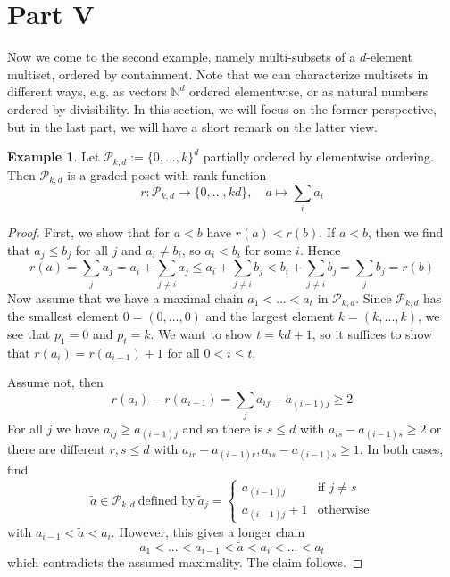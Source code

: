 \documentclass{scrartcl}
\newcommand{\N}{\mathbb{N}}
\theoremstyle{definition}
\newtheorem{example}[definition]{Example}
\begin{document}
\section{Part V}
Now we come to the second example, namely multi-subsets of a $d$-element multiset, ordered by containment.
Note that we can characterize multisets in different ways, e.g. as vectors $\N^d$ ordered elementwise, or as natural numbers ordered by divisibility.
In this section, we will focus on the former perspective, but in the last part, we will have a short remark on the latter view.
\begin{example}
    Let $\mathcal{P}_{k, d} := \{ 0, ..., k \}^d$ partially ordered by elementwise ordering.
    Then $\mathcal{P}_{k, d}$ is a graded poset with rank function
    \begin{equation*}
        r: \mathcal{P}_{k, d} \to \{ 0, ..., kd \}, \quad a \mapsto \sum_i a_i
    \end{equation*}
\end{example}
\begin{proof}
    First, we show that for $a < b$ have $r(a) < r(b)$.
    If $a < b$, then we find that $a_j \leq b_j$ for all $j$ and $a_i \neq b_i$, so $a_i < b_i$ for some $i$.
    Hence
    \begin{equation*}
        r(a) = \sum_j a_j = a_i + \sum_{j \neq i} a_j \leq a_i + \sum_{j \neq i} b_j < b_i + \sum_{j \neq i} b_j = \sum_j b_j = r(b)
    \end{equation*}
    Now assume that we have a maximal chain $a_1 < ... < a_t$ in $\mathcal{P}_{k, d}$.
    Since $\mathcal{P}_{k, d}$ has the smallest element $0 = (0, ..., 0)$ and the largest element $k = (k, ..., k)$, we see that $p_1 = 0$ and $p_t = k$.
    We want to show $t = kd + 1$, so it suffices to show that $r(a_i) = r(a_{i - 1}) + 1$ for all $0 < i \leq t$.

    Assume not, then 
    \begin{equation*}
        r(a_i) - r(a_{i - 1}) = \sum_j a_{ij} - a_{(i - 1)j} \geq 2
    \end{equation*}
    For all $j$ we have $a_{ij} \geq a_{(i - 1)j}$ and so there is $s \leq d$ with $a_{is} - a_{(i - 1)s} \geq 2$ or there are different $r, s \leq d$ with $a_{ir} - a_{(i - 1)r}, a_{is} - a_{(i - 1)s} \geq 1$.
    In both cases, find
    \begin{equation*}
        \tilde{a} \in \mathcal{P}_{k, d} \ \text{defined by} \ \tilde{a}_j = \begin{cases}
            a_{(i - 1)j} & \text{if $j \neq s$} \\
            a_{(i - 1)j} + 1 & \text{otherwise}
        \end{cases}
    \end{equation*}
    with $a_{i - 1} < \tilde{a} < a_i$. However, this gives a longer chain
    \begin{equation*}
        a_1 < ... < a_{i - 1} < \tilde{a} < a_i < ... < a_t
    \end{equation*}
    which contradicts the assumed maximality. The claim follows.
\end{proof}
\end{document}
